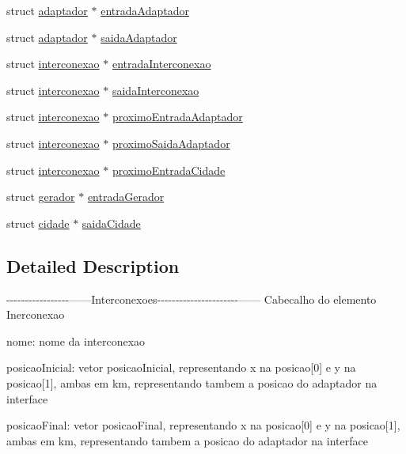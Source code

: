 \begin{DoxyCompactItemize}
\item 
struct \hyperlink{structadaptador}{adaptador} $\ast$ \hyperlink{structinterconexao_a14e2e66fac149b7994e268306d30326f}{entrada\-Adaptador}
\item 
struct \hyperlink{structadaptador}{adaptador} $\ast$ \hyperlink{structinterconexao_a89f6d0b2c88bb33283e80d439c01c575}{saida\-Adaptador}
\item 
struct \hyperlink{structinterconexao}{interconexao} $\ast$ \hyperlink{structinterconexao_a4e737e84160630dcb4b4a314d068361d}{entrada\-Interconexao}
\item 
struct \hyperlink{structinterconexao}{interconexao} $\ast$ \hyperlink{structinterconexao_ab5e0438b9abf57d318825660da5cb279}{saida\-Interconexao}
\item 
struct \hyperlink{structinterconexao}{interconexao} $\ast$ \hyperlink{structinterconexao_a3378cab97ff6faca1fed5284f60899ee}{proximo\-Entrada\-Adaptador}
\item 
struct \hyperlink{structinterconexao}{interconexao} $\ast$ \hyperlink{structinterconexao_a0f78c20456e02f17b9c66806392b7f80}{proximo\-Saida\-Adaptador}
\item 
struct \hyperlink{structinterconexao}{interconexao} $\ast$ \hyperlink{structinterconexao_a12754d0ee6ed8698342735cb34b9abae}{proximo\-Entrada\-Cidade}
\item 
struct \hyperlink{structgerador}{gerador} $\ast$ \hyperlink{structinterconexao_a84fba959cbecb5e3c55e9bd2907c8a82}{entrada\-Gerador}
\item 
struct \hyperlink{structcidade}{cidade} $\ast$ \hyperlink{structinterconexao_aa1457ad6c3cc7f9f64db35f10bda7133}{saida\-Cidade}
\end{DoxyCompactItemize}


\subsection{Detailed Description}
-\/-\/-\/-\/-\/-\/-\/-\/-\/-\/-\/-\/-\/-\/-\/-\/-\/------Interconexoes-\/-\/-\/-\/-\/-\/-\/-\/-\/-\/-\/-\/-\/-\/-\/-\/-\/-\/-\/-\/-\/-\/------ Cabecalho do elemento Inerconexao

nome\-: nome da interconexao

posicao\-Inicial\-: vetor posicao\-Inicial, representando x na posicao\mbox{[}0\mbox{]} e y na posicao\mbox{[}1\mbox{]}, ambas em km, representando tambem a posicao do adaptador na interface

posicao\-Final\-: vetor posicao\-Final, representando x na posicao\mbox{[}0\mbox{]} e y na posicao\mbox{[}1\mbox{]}, ambas em km, representando tambem a posicao do adaptador na interface

